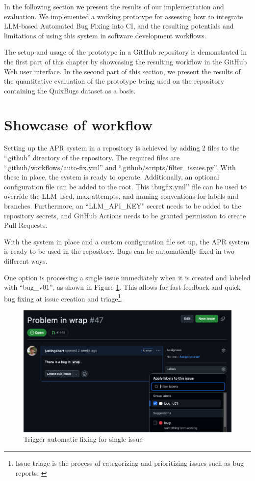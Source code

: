 In the following section we present the results of our implementation and evaluation. We implemented a working prototype for assessing how to integrate LLM-based Automated Bug Fixing into \ac{CI}, and the resulting potentials and limitations of using this system in software development workflows.

The setup and usage of the prototype in a GitHub repository is demonstrated in the first part of this chapter by showcasing the resulting workflow in the GitHub Web user interface. In the second part of this section, we present the results of the quantitative evaluation of the prototype being used on the repository containing the QuixBugs dataset as a basis.

\section{Showcase of workflow} \label{section:showcase}

Setting up the APR system in a repository is achieved by adding 2 files to the ``.github'' directory of the repository. The required files are ``.github/workflows/auto-fix.yml'' and ``.github/scripts/filter\_issues.py''. With these in place, the system is ready to operate. Additionally, an optional configuration file can be added to the root. This `.bugfix.yml'' file can be used to override the \ac{LLM} used, max attempts, and naming conventions for labels and branches. Furthermore, an ``LLM\_API\_KEY'' secret needs to be added to the repository secrets, and GitHub Actions needs to be granted permission to create Pull Requests.

With the system in place and a custom configuration file set up, the APR system is ready to be used in the repository. Bugs can be automatically fixed in two different ways.

One option is processing a single issue immediately when it is created and labeled with ``bug\_v01'', as shown in Figure \ref{fig:issue-trigger}. This allows for fast feedback and quick bug fixing at issue creation and triage\footnote{Issue triage is the process of categorizing and prioritizing issues such as bug reports. \cite{IssuesTriaging}}.

\begin{figure}[H]
    \centering
    \includegraphics[width=1\textwidth]{images/workflow/label_issue.png}
    \caption{Trigger automatic fixing for single issue}
    \label{fig:issue-trigger}
\end{figure}

